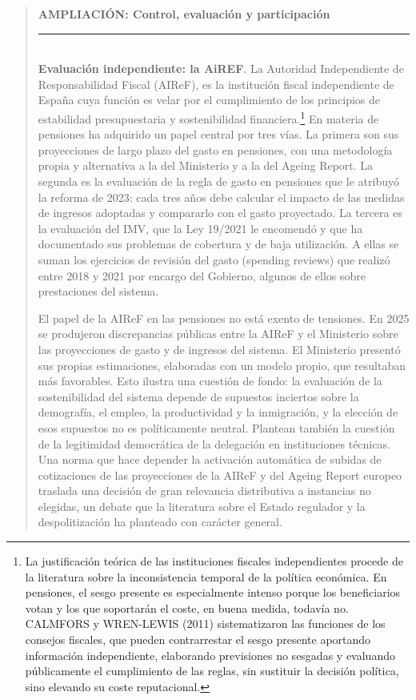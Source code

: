 \documentclass[10pt,a4paper]{article}
\newenvironment{specialblock}[1]{%
      \begin{quote} %
      \small %
      \noindent\textbf{#1}\\[-0.3em] %
      \rule{\linewidth}{0.4pt}\\[0.6em]}{
      \end{quote}}
\begin{document}
\begin{specialblock}{\textbf{AMPLIACIÓN:} Control, evaluación y participación}
    \textbf{Evaluación independiente: la AiREF}. La Autoridad Independiente de Responsabilidad Fiscal (AIReF), es la institución fiscal independiente de España cuya función es velar por el cumplimiento de los principios de estabilidad presupuestaria y sostenibilidad financiera.\footnote{%
        La justificación teórica de las instituciones fiscales independientes procede de la literatura sobre la inconsistencia temporal de la política económica. En pensiones, el sesgo presente es especialmente intenso porque los beneficiarios votan y los que soportarán el coste, en buena medida, todavía no. CALMFORS y WREN-LEWIS (2011) sistematizaron las funciones de los consejos fiscales, que pueden contrarrestar el sesgo presente aportando información independiente, elaborando previsiones no sesgadas y evaluando públicamente el cumplimiento de las reglas, sin sustituir la decisión política, sino elevando su coste reputacional.
    } En materia de pensiones ha adquirido un papel central por tres vías. La primera son sus proyecciones de largo plazo del gasto en pensiones, con una metodología propia y alternativa a la del Ministerio y a la del Ageing Report. La segunda es la evaluación de la regla de gasto en pensiones que le atribuyó la reforma de 2023: cada tres años debe calcular el impacto de las medidas de ingresos adoptadas y compararlo con el gasto proyectado. La tercera es la evaluación del IMV, que la Ley 19/2021 le encomendó y que ha documentado sus problemas de cobertura y de baja utilización. A ellas se suman los ejercicios de revisión del gasto (spending reviews) que realizó entre 2018 y 2021 por encargo del Gobierno, algunos de ellos sobre prestaciones del sistema.
    
    El papel de la AIReF en las pensiones no está exento de tensiones. En 2025 se produjeron discrepancias públicas entre la AIReF y el Ministerio sobre las proyecciones de gasto y de ingresos del sistema. El Ministerio presentó sus propias estimaciones, elaboradas con un modelo propio, que resultaban más favorables. Esto ilustra una cuestión de fondo: la evaluación de la sostenibilidad del sistema depende de supuestos inciertos sobre la demografía, el empleo, la productividad y la inmigración, y la elección de esos supuestos no es políticamente neutral. Plantean también la cuestión de la legitimidad democrática de la delegación en instituciones técnicas. Una norma que hace depender la activación automática de subidas de cotizaciones de las proyecciones de la AIReF y del Ageing Report europeo traslada una decisión de gran relevancia distributiva a instancias no elegidas, un debate que la literatura sobre el Estado regulador y la despolitización ha planteado con carácter general.


\end{specialblock}
\end{document}
